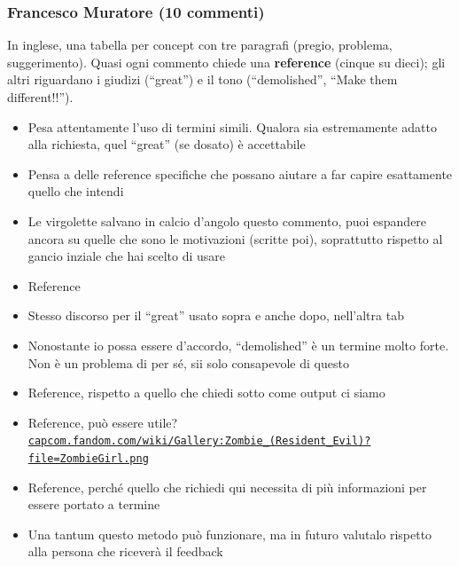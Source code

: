 
\subsubsection{Francesco Muratore (10 commenti)}
In inglese, una tabella per concept con tre paragrafi (pregio, problema, suggerimento). Quasi ogni commento chiede una \textbf{reference} (cinque su dieci); gli altri riguardano i giudizi (``great'') e il tono (``demolished'', ``Make them different!!'').
{\small
\begin{itemize}
  \item {} Pesa attentamente l'uso di termini simili. Qualora sia estremamente adatto alla richiesta, quel ``great'' (se dosato) è accettabile
  \item {} Pensa a delle reference specifiche che possano aiutare a far capire esattamente quello che intendi
  \item {} Le virgolette salvano in calcio d'angolo questo commento, puoi espandere ancora su quelle che sono le motivazioni (scritte poi), soprattutto rispetto al gancio inziale che hai scelto di usare
  \item {} Reference
  \item {} Stesso discorso per il ``great'' usato sopra e anche dopo, nell'altra tab
  \item {} Nonostante io possa essere d'accordo, ``demolished'' è un termine molto forte. Non è un problema di per sé, sii solo consapevole di questo
  \item {} Reference, rispetto a quello che chiedi sotto come output ci siamo
  \item {} Reference, può essere utile? \href{https://capcom.fandom.com/wiki/Gallery:Zombie_(Resident_Evil)?file=ZombieGirl.png}{\texttt{capcom.fandom.com/\allowbreak wiki/\allowbreak Gallery:\allowbreak Zombie\_(Resident\_Evil)?\allowbreak file=\allowbreak ZombieGirl.png}}
  \item {} Reference, perché quello che richiedi qui necessita di più informazioni per essere portato a termine
  \item {} Una tantum questo metodo può funzionare, ma in futuro valutalo rispetto alla persona che riceverà il feedback
\end{itemize}
}


